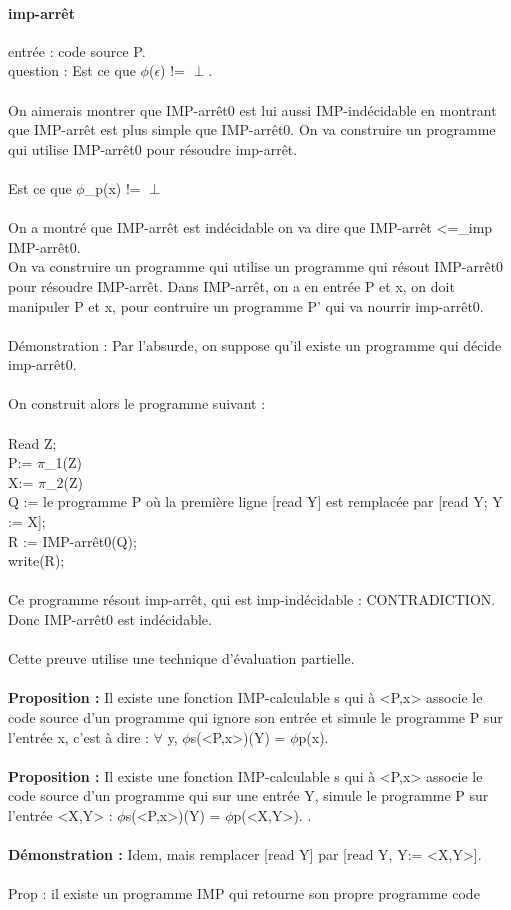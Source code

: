 \documentclass{article}
\begin{document}
\paragraph{imp-arrêt}entrée : code source P.\\question : Est ce que $\phi$($\epsilon$) != $\perp$.\\\\On aimerais montrer que IMP-arrêt0 est lui aussi IMP-indécidable en montrant que IMP-arrêt est plus simple que IMP-arrêt0. On va construire un programme qui utilise IMP-arrêt0  pour résoudre imp-arrêt.\\\\

Est ce que $\phi$\_{p}(x) != $\perp$ \\\\On a montré que IMP-arrêt est indécidable on va dire que IMP-arrêt <=\_{imp} IMP-arrêt0.\\On va construire un programme qui utilise un programme qui résout IMP-arrêt0 pour résoudre IMP-arrêt. Dans IMP-arrêt, on a en entrée P et x, on doit manipuler P et x, pour contruire un programme P' qui va nourrir imp-arrêt0.\\\\Démonstration : Par l'absurde, on suppose qu'il existe un programme qui décide imp-arrêt0.\\\\On construit alors le programme suivant : \\\\Read Z;\\P:= $\pi$\_{1}(Z)\\X:= $\pi$\_{2}(Z)\\Q := le programme P où la première ligne [read Y] est remplacée par [read Y; Y := X];\\R := IMP-arrêt0(Q);\\write(R);\\\\Ce programme résout imp-arrêt, qui est imp-indécidable : CONTRADICTION. Donc IMP-arrêt0 est indécidable.\\\\Cette preuve utilise une technique d'évaluation partielle.\\\\\textbf{Proposition : } Il existe une fonction IMP-calculable s qui à <P,x> associe le code source d'un programme qui ignore son entrée et simule le programme P sur l'entrée x, c’est à dire : $\forall$ y, $\phi$s(<P,x>)(Y) = $\phi$p(x).\\\\\textbf{Proposition : } Il existe une fonction IMP-calculable s qui à <P,x> associe le code source d'un programme qui sur une entrée Y, simule le programme P sur l'entrée <X,Y>  : $\phi$s(<P,x>)(Y) = $\phi$p(<X,Y>). .\\\\\textbf{Démonstration : } Idem, mais remplacer [read Y] par [read Y, Y:= <X,Y>].\\\\Prop : il existe un programme IMP qui retourne son propre programme code 
\end{document}
